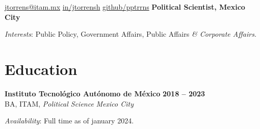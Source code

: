 \documentclass[letter]{resume}
\begin{document}
\begin{center}
{\href{mailto://jtorrens@itam.mx}{jtorrens@itam.mx}}
{\href{https://www.linkedin.com/in/jtorrensh/}{in/jtorrensh}}
{\href{https://github.com/pptrrns}{github/pptrrns}}
{\bf Political Scientist, Mexico City}

\emph{Interests}: {Public Policy, Government Affairs, Public Affairs \em\& Corporate Affairs.}
\end{center}

\section{Education} 
\begin{content}
{\bf Instituto Tecnológico Autónomo de México} \emph {} \hfill {\bf 2018 -- 2023} \\ 
{BA, ITAM, \emph{Political Science}} \hfill \emph {Mexico City}

\emph{Availability}: {Full time as of january 2024.}

\sectionlineskip
\end{content}

\end{document}
